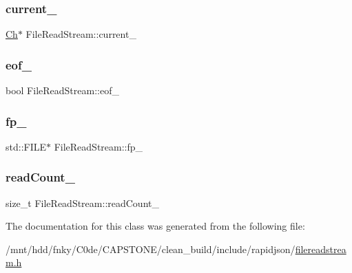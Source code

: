 \subsubsection{\texorpdfstring{current\+\_\+}{current\_}}
{\footnotesize\ttfamily \hyperlink{classFileReadStream_ae1f83d9ca3c76d1d151af0b6c427f046}{Ch}$\ast$ File\+Read\+Stream\+::current\+\_\+\hspace{0.3cm}{\ttfamily [private]}}

\mbox{\label{classFileReadStream_a02a64d8fc7a4df830834f756b8ac08af}} 
\subsubsection{\texorpdfstring{eof\+\_\+}{eof\_}}
{\footnotesize\ttfamily bool File\+Read\+Stream\+::eof\+\_\+\hspace{0.3cm}{\ttfamily [private]}}

\mbox{\label{classFileReadStream_a47dc4f7f100bcc02a02e619f9b494a62}} 
\subsubsection{\texorpdfstring{fp\+\_\+}{fp\_}}
{\footnotesize\ttfamily std\+::\+F\+I\+LE$\ast$ File\+Read\+Stream\+::fp\+\_\+\hspace{0.3cm}{\ttfamily [private]}}

\mbox{\label{classFileReadStream_a1b1a7cadb599e83b1f781c0b16d4ed50}} 
\subsubsection{\texorpdfstring{read\+Count\+\_\+}{readCount\_}}
{\footnotesize\ttfamily size\+\_\+t File\+Read\+Stream\+::read\+Count\+\_\+\hspace{0.3cm}{\ttfamily [private]}}



The documentation for this class was generated from the following file\+:\begin{DoxyCompactItemize}
\item 
/mnt/hdd/fnky/\+C0de/\+C\+A\+P\+S\+T\+O\+N\+E/clean\+\_\+build/include/rapidjson/\hyperlink{filereadstream_8h}{filereadstream.\+h}\end{DoxyCompactItemize}
